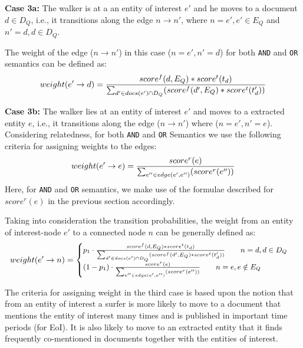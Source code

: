 \vspace{2mm}\noindent
{\bf Case 3a:} The walker is at a an entity of interest $e'$ and he moves to
a document $d \in D_Q$, i.e., it transitions along the edge $n \rightarrow n'$, where
$n=e', e' \in E_Q$ and $n'=d, d \in D_Q$.

The weight of the edge ($n \rightarrow n'$) in this case ($n=e', n'=d$) for
both {\tt AND} and {\tt OR} semantics can be defined as:
\begin{equation}
\begin{split}
\small
weight(e' \rightarrow d) = \frac{score^{f}(d,E_Q)*score^{t}(t_d)}{\sum_{d' \in docs(e') \cap D_Q}(score^{f}(d',E_Q)*score^{t}(t_d'))}
\end{split}
\end{equation}

\vspace{2mm}\noindent
{\bf Case 3b:} The walker lies at an entity of interest $e'$ and moves to
a extracted entity $e$, i.e., it transitions along the edge ($n \rightarrow n'$) where
($n=e', n'=e$). Considering relatedness, for both {\tt AND} and {\tt OR} Semantics
we use the following criteria for assigning weights to the edges:
\begin{equation}
\begin{split}
\small
weight(e' \rightarrow e) = \frac{score^{r}(e)}{\sum_{e'' \in edge(e', e'')}(score^{r}(e''))}
\end{split}
\end{equation}
Here, for {\tt AND} and {\tt OR} semantics, we make use of the formulae described for $score^{r}(e)$
in the previous section accordingly.

\vspace{2mm}\noindent
Taking into consideration the transition probabilities,
the weight from an entity of interest-node $e'$ to a connected node $n$ can be
generally defined as:
\begin{gather}
\small
weight(e' \rightarrow n) = \begin{cases}
    p_1 \cdot \frac{score^{f}(d,E_Q)*score^{t}(t_d)}{\sum_{d' \in docs(e') \cap D_Q}(score^{f}(d',E_Q)*score^{t}(t_d'))}\qquad
    n = d, d \in D_Q\\
    (1-p_1) \cdot \frac{score^{r}(e)}{\sum_{e'' \in edge(e', e'')}(score^{r}(e''))}\qquad n = e, e \notin E_Q
\end{cases}
\end{gather}


\vspace{2mm}\noindent
The criteria for assigning weight in the third case is based upon the
notion that from an entity of interest a surfer is more likely to move to a document
that mentions the entity of interest many times and is published in important
time periods (for EoI). It is also likely to move to an extracted entity that it
finds frequently co-mentioned in documents together with the entities of interest.


